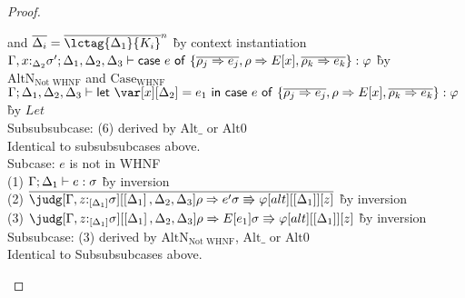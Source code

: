 \begin{proof}
\begin{tabbing}
       and $\ov{\D_i} = \ov{\lctag{\D_1}{K_i}}^n$ \` by context
       instantiation\\
         $\Gamma,x{:}_{\Delta_2}\sigma'; \Delta_1,\Delta_2,\Delta_3 \vdash \mathsf{case}~e~\mathsf{of}~\{\overline{\rho_j\Rightarrow e_j}, \rho \Rightarrow
  E[x], \overline{\rho_k\Rightarrow e_k}\} : \varphi$ \` by $\textrm{AltN}_{\textrm{Not
           WHNF}}$ and
       $\textrm{Case}_\textrm{WHNF}$\\
         $\G ; \D_1 , \D_2 , \D_3 \vdash \llet{\x[\D_2] = e_1}{\ccase{e}{\{\overline{\rho_j\Rightarrow e_j}, \rho \Rightarrow
           E[x], \overline{\rho_k\Rightarrow e_k}\}}} : \vp$ \` by
       $\mathit{Let}$\\
       Subsubsubcase: (6) derived by $\textrm{Alt}\_$ or
       $\textrm{Alt}0$\\
       Identical to subsubsubcases above.\\
       Subcase: $e$ is not in WHNF\\
       (1) $\Gamma ; \Delta_1 \vdash e : \sigma$ \` by inversion\\
       (2) $\ov{\judg[\G,z{:}_{\irr{\D_1}}\s][\irr{\D_1},\D_2,\D_3]{\rho\Rightarrow
           e'}{\s \Rrightarrow \vp}[alt][\irr{\D_1}][z]}$ \` by
       inversion\\
       (3) $\judg[\G,z{:}_{\irr{\D_1}}\s][\irr{\D_1},\D_2,\D_3]{\rho\Rightarrow
           E[e_1]}{\s \Rrightarrow \vp}[alt][\irr{\D_1}][z]$ \` by
         inversion\\
       Subsubcase: (3) derived by $\textrm{AltN}_{\textrm{Not
           WHNF}}$, $\textrm{Alt}\_$ or
       $\textrm{Alt}0$\\
       Identical to Subsubsubcases above.
     \end{tabbing}

   \end{proof}
